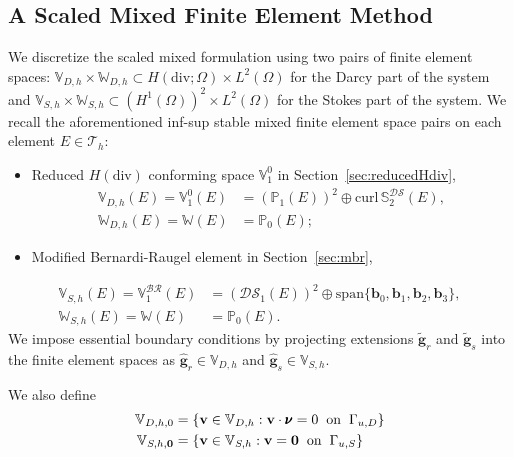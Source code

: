 \subsection{A Scaled Mixed Finite Element Method}
We discretize the scaled mixed formulation using
two pairs of finite element spaces: $\mathbb{V}_{D,h} \times \mathbb{W}_{D,h} \subset H(\text{div}; \Omega) \times L^2(\Omega)$ for the Darcy part of the system
and $\mathbb{V}_{S,h} \times \mathbb{W}_{S,h} \subset (H^1(\Omega))^2 \times L^2(\Omega)$ for the Stokes part of the system.
We recall the aforementioned inf-sup stable mixed finite element space pairs on each element $E \in \mathcal{T}_h$:
\begin{itemize}
		  \item Reduced $H(\text{div})$ conforming space $\mathbb{V}_1^0$ in Section~\ref{sec:reducedHdiv},
\begin{equation}
\begin{aligned}
		  \mathbb{V}_{D,h}(E) = \mathbb{V}_1^0(E) &= (\mathbb{P}_1(E))^2 \oplus 
		  \text{curl}\,\mathbb{S}_2^{\mathcal{DS}}(E), \\
					 \mathbb{W}_{D,h}(E) = \mathbb{W}(E) &= \mathbb{P}_0(E);
\end{aligned}
\end{equation}

\item Modified Bernardi-Raugel element in Section~\ref{sec:mbr},
\end{itemize}
\begin{equation}
\begin{aligned}
		  \mathbb{V}_{S,h}(E) = \mathbb{V}^{\mathcal{BR}}_1(E) &= (\mathcal{DS}_1(E))^2 \oplus \text{span}\{\mathbf{b}_0,\mathbf{b}_1,\mathbf{b}_2,\mathbf{b}_3 \}, \\
		  \mathbb{W}_{S,h}(E) = \mathbb{W}(E)   &= \mathbb{P}_0(E).
		  \end{aligned}
\end{equation}
We impose essential boundary conditions by projecting extensions
$\tilde{\mathbf{g}}_r$ and $\tilde{\mathbf{g}}_s$ into
the finite element spaces as $\hat{\mathbf{g}}_r \in \mathbb{V}_{D,h}$ and $\hat{\mathbf{g}}_s \in \mathbb{V}_{S,h}$.

We also define 
\begin{equation}
		  \begin{aligned}
					 \mathbb{V}_{D,h,0} &= \{\mathbf{v} \in \mathbb{V}_{D,h} : \mathbf{v}\cdot \pmb{\nu} = 0 \hspace{0.2cm} \text{on} \hspace{0.2cm} \Gamma_{u,D}\} \\
					 \mathbb{V}_{S,h,\mathbf{0}} &= \{\mathbf{v} \in \mathbb{V}_{S,h} : \mathbf{v} = \mathbf{0} \hspace{0.2cm} \text{on} \hspace{0.2cm} \Gamma_{u,S}\} 
		  \end{aligned}
\end{equation}

